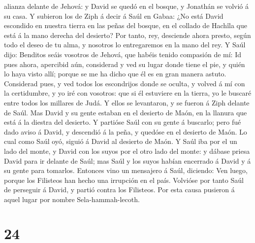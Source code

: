 alianza delante de Jehová: y David se quedó en el bosque, y Jonathán se
volvió á su casa.  Y subieron los de Ziph á decir á Saúl en
Gabaa: ¿No está David escondido en nuestra tierra en las peñas del
bosque, en el collado de Hachîla que está á la mano derecha del
desierto?  Por tanto, rey, desciende ahora presto, según
todo el deseo de tu alma, y nosotros lo entregaremos en la mano del rey.
 Y Saúl dijo: Benditos seáis vosotros de Jehová, que habéis
tenido compasión de mí:  Id pues ahora, apercibid aún,
considerad y ved su lugar donde tiene el pie, y quién lo haya visto
allí; porque se me ha dicho que él es en gran manera astuto.
 Considerad pues, y ved todos los escondrijos donde se
oculta, y volved á mí con la certidumbre, y yo iré con vosotros: que si
él estuviere en la tierra, yo le buscaré entre todos los millares de
Judá.  Y ellos se levantaron, y se fueron á Ziph delante de
Saúl. Mas David y su gente estaban en el desierto de Maón, en la llanura
que está á la diestra del desierto.  Y partióse Saúl con su
gente á buscarlo; pero fué dado aviso á David, y descendió á la peña, y
quedóse en el desierto de Maón. Lo cual como Saúl oyó, siguió á David al
desierto de Maón.  Y Saúl iba por el un lado del monte, y
David con los suyos por el otro lado del monte: y dábase priesa David
para ir delante de Saúl; mas Saúl y los suyos habían encerrado á David y
á su gente para tomarlos.  Entonces vino un mensajero á
Saúl, diciendo: Ven luego, porque los Filisteos han hecho una irrupción
en el país.  Volvióse por tanto Saúl de perseguir á David,
y partió contra los Filisteos. Por esta causa pusieron á aquel lugar por
nombre Sela-hammah-lecoth. 

\hypertarget{section-23}{%
\section{24}\label{section-23}}

